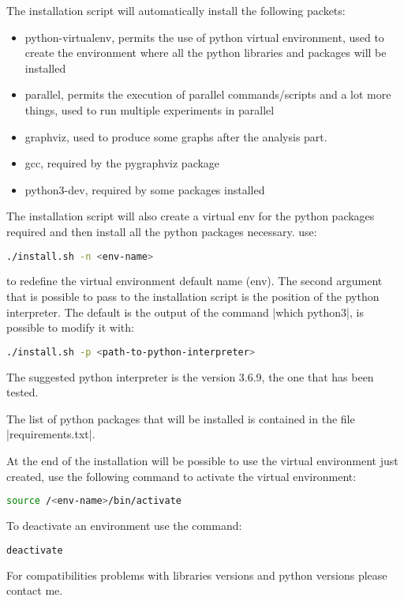 \documentclass[10pt,journal,onecolumn]{IEEEtran}
\begin{document}
The installation script will automatically install the following packets:
\begin{itemize}
		\item python-virtualenv, permits the use of python virtual environment,
			used to create the environment where all the python libraries and packages
			will be installed
		\item parallel, permits the execution of parallel commands/scripts and
			a lot more things, used to run multiple experiments in parallel
		\item graphviz, used to produce some graphs after the analysis part.
		\item gcc, required by the pygraphviz package
		\item python3-dev, required by some packages installed
\end{itemize}
The installation script will also create a virtual env for the python packages
required and then install all the python packages necessary.
use:
\begin{lstlisting}[language=bash]
	./install.sh -n <env-name>
\end{lstlisting}
to redefine the virtual environment default name (env).
The second argument that is possible to pass to the installation script is
the position of the python interpreter.
The default is the output of the command |which python3|, is possible to modify
it with:
\begin{lstlisting}[language=bash]
	./install.sh -p <path-to-python-interpreter>
\end{lstlisting}

The suggested python interpreter is the version 3.6.9, the one that has been tested.

The list of python packages that will be installed is contained in the file
|requirements.txt|.

At the end of the installation will be possible to use the virtual environment
just created, use the following command to activate the virtual environment:
\begin{lstlisting}[language=bash]
	source /<env-name>/bin/activate
\end{lstlisting}
To deactivate an environment use the command:
\begin{lstlisting}[language=bash]
	deactivate
\end{lstlisting}

For compatibilities problems with libraries versions and python versions
please contact me.
\end{document}

